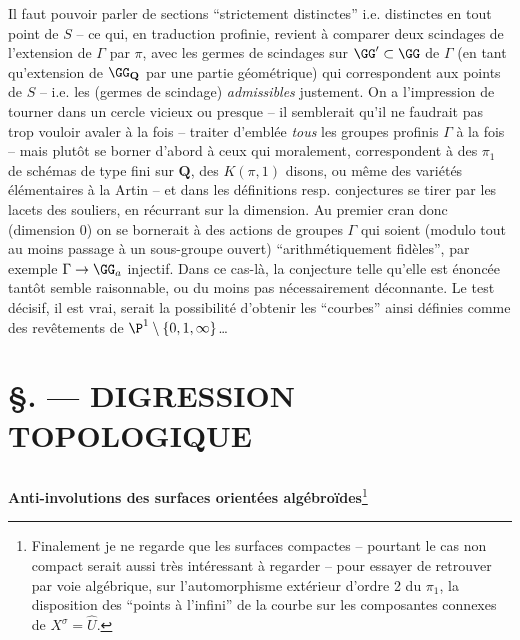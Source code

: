Il faut pouvoir parler de sections ``strictement distinctes''
i.e. distinctes en tout point de $S$ -- ce qui, en traduction
profinie, revient à comparer deux scindages de l'extension
de $\Gamma$ par $\pi$, avec les germes de scindages sur
$\GG'\subset \GG$ de $\Gamma$ (en tant qu'extension de 
$\GG_{\mathbf{Q}}$ par une partie géométrique) qui correspondent
aux points de $S$ -- i.e. les (germes de scindage)
{\it admissibles} justement.  On a l'impression de tourner dans
un cercle vicieux ou presque -- il semblerait qu'il ne
faudrait pas trop vouloir avaler à la fois -- traiter d'emblée
{\it tous} les groupes profinis $\Gamma$ à la fois --
mais plutôt se borner d'abord à ceux qui moralement,
correspondent à des $\pi_1$ de schémas de type fini sur ${\mathbf{Q}}$,
des $K(\pi,1)$ disons, ou même des variétés élémentaires
à la Artin -- et dans les définitions
resp. conjectures se tirer par les lacets des souliers, en
récurrant sur la dimension.  Au premier cran donc
(dimension $0$) on se bornerait à des actions de groupes
$\Gamma$ qui soient (modulo tout au moins passage à un
sous-groupe ouvert) ``arithmétiquement fidèles'', par
exemple $\Gamma\to\GG_a$ injectif.  Dans ce cas-là,
la conjecture telle qu'elle est énoncée tantôt
semble raisonnable, ou du moins pas nécessairement 
déconnante.  Le test décisif, il est vrai, serait la
possibilité d'obtenir les ``courbes'' ainsi définies
comme des revêtements de ${\P}^1\setminus\{0,1,\infty\}$\dots















\chapter*{\S {}. --- DIGRESSION TOPOLOGIQUE}\thispagestyle{empty}
\label{sec:33}
\section*{}

{\bf Anti-involutions des surfaces orientées algébroïdes}\footnote{Finalement je ne regarde que
les surfaces compactes -- pourtant le
cas non compact serait aussi très intéressant à regarder -- 
pour essayer de retrouver par voie algébrique, sur l'automorphisme
extérieur d'ordre 2 du $\pi_1$, la disposition des ``points à 
l'infini'' de la courbe sur les composantes connexes de $X^\sigma
=\hat U$.}

